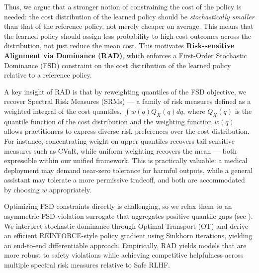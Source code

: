 

Thus, we argue that a stronger notion of constraining the cost of the policy is needed: the cost distribution of the learned policy should be \emph{stochastically smaller} than that of the reference policy, not merely cheaper on average.  This means that the learned policy should assign less probability to high-cost outcomes across the distribution, not just reduce the mean cost. This motivates \textbf{Risk-sensitive Alignment via Dominance (RAD)}, which enforces a First-Order Stochastic Dominance (FSD) constraint on the cost distribution of the learned policy relative to a reference policy.

A key insight of RAD is that by reweighting quantiles of the FSD objective, we recover Spectral Risk Measures (SRMs) — a family of risk measures defined as a weighted integral of the cost quantiles,
$\int w(q) Q_X(q) dq$, where $Q_X(q)$ is the quantile function of the cost distribution and the weighting function $w(q)$ allows
practitioners to express diverse risk preferences over the cost distribution. For instance, concentrating weight on upper quantiles recovers tail-sensitive measures such as CVaR, while uniform weighting recovers the mean — both expressible within our unified framework. This is practically valuable: a medical deployment may demand near-zero tolerance for harmful outputs, while a general assistant
may tolerate a more permissive tradeoff, and both are accommodated by choosing $w$ appropriately.

Optimizing FSD constraints directly is challenging, so we relax them to an asymmetric FSD-violation surrogate that aggregates positive quantile gaps (see ). We interpret stochastic
dominance through Optimal Transport (OT) and derive an efficient REINFORCE-style policy gradient using Sinkhorn iterations, yielding an end-to-end differentiable approach. Empirically, RAD yields models that are more robust to safety violations while achieving competitive helpfulness across multiple spectral risk measures relative to Safe RLHF.

